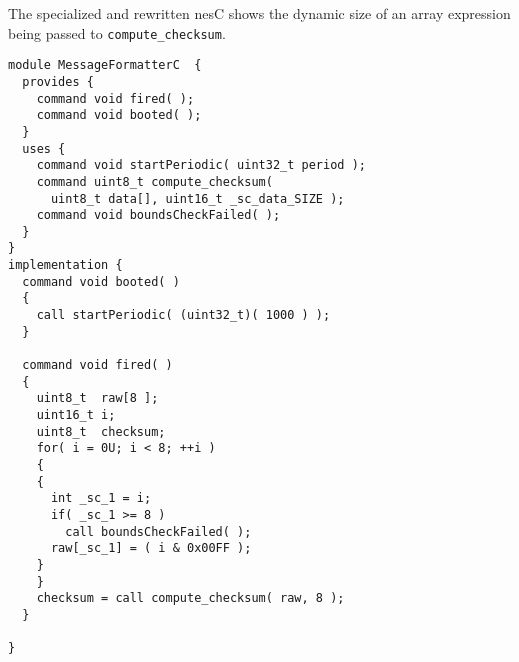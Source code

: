 The specialized and rewritten nesC shows the dynamic size of an array expression being passed to
\texttt{compute\_checksum}.

\singlespace
\vspace{1.0ex}
\begin{lstlisting}[language=nesC]
module MessageFormatterC  {
  provides {
    command void fired( );
    command void booted( );
  }
  uses {
    command void startPeriodic( uint32_t period );
    command uint8_t compute_checksum(
      uint8_t data[], uint16_t _sc_data_SIZE );
    command void boundsCheckFailed( );
  }
}
implementation {
  command void booted( ) 
  {
    call startPeriodic( (uint32_t)( 1000 ) );
  }

  command void fired( ) 
  {
    uint8_t  raw[8 ];
    uint16_t i;
    uint8_t  checksum;
    for( i = 0U; i < 8; ++i )
    {
    {
      int _sc_1 = i;
      if( _sc_1 >= 8 )
        call boundsCheckFailed( );
      raw[_sc_1] = ( i & 0x00FF );
    }
    }
    checksum = call compute_checksum( raw, 8 );
  }

}
\end{lstlisting}
\vspace{1.0ex}
\primaryspacing

